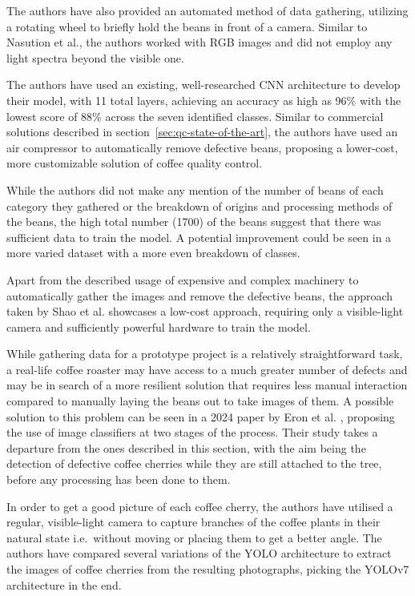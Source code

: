 The authors have also provided an automated method of data gathering, utilizing a
rotating wheel to briefly hold the beans in front of a camera.
Similar to
Nasution et al.\cite{manyRoastLevelsNasution}, the authors worked with RGB images
and did not employ any light spectra beyond the visible one.

The authors have used an existing, well-researched CNN architecture to develop
their model, with 11 total layers, achieving an accuracy as high as 96\% with the
lowest score of 88\% across the seven identified classes.
Similar to commercial solutions
described in section~\ref{sec:qc-state-of-the-art}, the authors have used an air
compressor to automatically remove defective beans, proposing a lower-cost, more
customizable solution of coffee quality control.

While the authors did not make any mention of the number of beans of each
category they gathered or the breakdown of origins and processing methods of the
beans, the high total number (1700) of the beans suggest that there was sufficient
data to train the model.
A potential improvement could be seen in a more varied
dataset with a more even breakdown of classes.

Apart from the described usage of expensive and complex machinery to
automatically gather the images and remove the defective beans, the approach taken
by Shao et al.\cite{rgbDeepLearningShao} showcases a low-cost approach, requiring only a visible-light camera
and sufficiently powerful hardware to train the model.

While gathering data for a prototype project is a relatively straightforward task,
a real-life coffee roaster may have access to a much greater number of defects
and may be in search of a more resilient solution that requires less manual
interaction compared to manually laying the beans out to take images of them.
A possible
solution to this problem can be seen in a 2024 paper by Eron et al.
\cite{eronCoffeeCherryOnTrees}, proposing the use of image classifiers at two stages
of the process.
Their study takes a departure from the ones described in this
section, with the aim being the detection of defective coffee cherries while they
are still attached to the tree, before any processing has been done to them.

In order to get a good picture of each coffee cherry, the authors have utilised a
regular, visible-light camera to capture branches of the coffee plants in their
natural state i.e.\ without moving or placing them to get a better angle.
The
authors have compared several variations of the YOLO architecture to extract the
images of coffee cherries from the resulting photographs, picking the YOLOv7 architecture
in the end.

